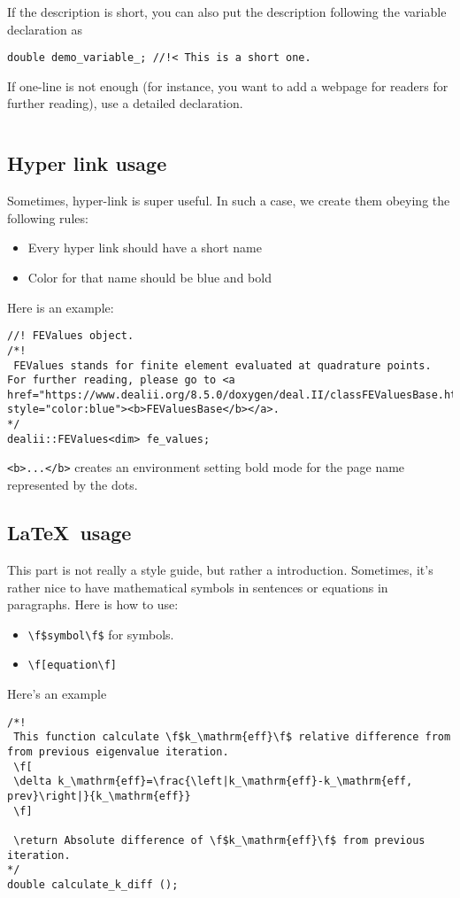 \documentclass{article}
\newcommand{\latex}{\LaTeX}
\begin{document}
If the description is short, you can also put the description following the variable declaration as
\begin{lstlisting}
double demo_variable_; //!< This is a short one.
\end{lstlisting}

If one-line is not enough (for instance, you want to add a webpage for readers for further reading), use a detailed declaration.
\begin{lstlisting}

\end{lstlisting}

\subsection{Hyper link usage}
Sometimes, hyper-link is super useful. In such a case, we create them obeying the following rules:
\begin{itemize}
	\item Every hyper link should have a short name
	\item Color for that name should be blue and bold
\end{itemize}

Here is an example:
\begin{lstlisting}
//! FEValues object.
/*!
 FEValues stands for finite element evaluated at quadrature points. For further reading, please go to <a href="https://www.dealii.org/8.5.0/doxygen/deal.II/classFEValuesBase.html" style="color:blue"><b>FEValuesBase</b></a>.
*/
dealii::FEValues<dim> fe_values;
\end{lstlisting}
{\tt <b>...</b>} creates an environment setting bold mode for the page name represented by the dots.

\subsection{\latex\ usage}
This part is not really a style guide, but rather a introduction. Sometimes, it's rather nice to have mathematical symbols in sentences or equations in paragraphs. Here is how to use:
\begin{itemize}
	\item {\tt \textbackslash f\$symbol\textbackslash f\$} for symbols.
	\item {\tt \textbackslash f[equation\textbackslash f]}
\end{itemize}

Here's an example
\begin{lstlisting}
/*!
 This function calculate \f$k_\mathrm{eff}\f$ relative difference from from previous eigenvalue iteration.
 \f[
 \delta k_\mathrm{eff}=\frac{\left|k_\mathrm{eff}-k_\mathrm{eff, prev}\right|}{k_\mathrm{eff}}
 \f]
 
 \return Absolute difference of \f$k_\mathrm{eff}\f$ from previous iteration.
*/
double calculate_k_diff ();
\end{lstlisting}
\end{document}

